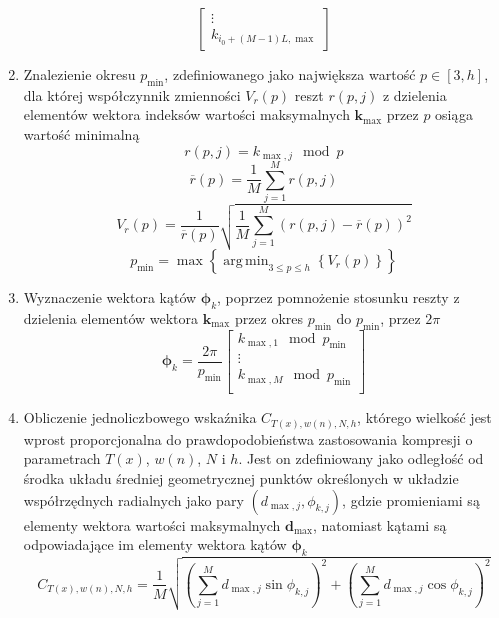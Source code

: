 \documentclass[pl,12pt]{aghdpl}
\DeclareMathOperator*{\argmin}{arg\,min}
\begin{document}
\begin{enumerate}
\begin{equation}
\begin{bmatrix}
          \vdots\\
          k_{i_0+(M-1)L,\max}
        \end{bmatrix}
      \end{equation}
    \item Znalezienie okresu $p_{\min}$, zdefiniowanego jako największa wartość
      $p \in [3, h]$, dla której współczynnik zmienności $V_{r}(p)$ reszt $r(p,
      j)$ z dzielenia elementów wektora indeksów wartości maksymalnych $\bm
      k_{\max}$ przez $p$ osiąga wartość minimalną
      \begin{equation}
        r(p, j) = k_{\max, j}\mod p
      \end{equation}
      \begin{equation}
        \overline r(p) = \frac{1}{M}\sum_{j=1}^{M}r(p, j)
      \end{equation}
      \begin{equation}
        V_{r}(p) = \frac{1}{\overline r(p)}\sqrt{\frac{1}{M}
        \sum_{j=1}^{M}\left(r(p, j) - \overline r(p)\right)^2}
      \end{equation}
      \begin{equation}
        p_{\min} = \max\left\{\argmin_{3 \leq p \leq h}
        \left\{V_{r}(p)\right\}\right\}
      \end{equation}
    \item Wyznaczenie wektora kątów $\bm\phi_k$, poprzez pomnożenie stosunku
      reszty z dzielenia elementów wektora $\bm k_{\max}$ przez
      okres $p_{\min}$ do $p_{\min}$, przez $2\pi$
      \begin{equation}
        \bm\phi_k = \frac{2\pi}{p_{\min}}\begin{bmatrix}
          k_{\max,1}\mod p_{\min}\\
          \vdots\\
          k_{\max,M}\mod p_{\min}\\
        \end{bmatrix}
      \end{equation}
    \item Obliczenie jednoliczbowego wskaźnika $C_{T(x),w(n),N,h}$, którego
      wielkość jest wprost proporcjonalna do prawdopodobieństwa zastosowania
      kompresji o parametrach $T(x)$, $w(n)$, $N$ i $h$. Jest
      on zdefiniowany jako odległość od środka układu średniej geometrycznej
      punktów określonych w układzie współrzędnych radialnych jako pary
      $(d_{\max, j}, \phi_{k, j})$, gdzie promieniami są elementy wektora
      wartości maksymalnych $\bm d_{\max}$, natomiast kątami są odpowiadające im
      elementy wektora kątów $\bm\phi_k$
      \begin{equation}
        C_{T(x),w(n),N,h} =\frac{1}{M}\sqrt{\left(\sum_{j=1}^{M}d_{\max,j}\sin
        \phi_{k,j}\right)^2+\left(\sum_{j=1}^{M}d_{\max,j}\cos
        \phi_{k,j}\right)^2}
      \end{equation}
\end{enumerate}
\end{document}
